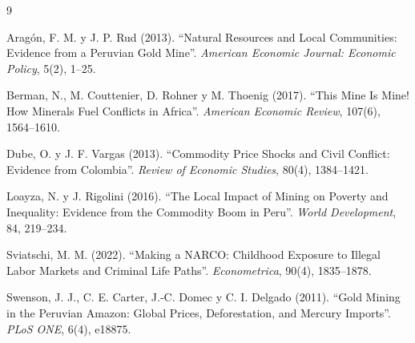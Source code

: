 \documentclass[11pt,a4paper]{article}
\begin{document}
\begin{thebibliography}{9}
\small

Aragón, F. M. y J. P. Rud (2013). ``Natural Resources and Local Communities: Evidence from a Peruvian Gold Mine''. \emph{American Economic Journal: Economic Policy}, 5(2), 1--25.

Berman, N., M. Couttenier, D. Rohner y M. Thoenig (2017). ``This Mine Is Mine! How Minerals Fuel Conflicts in Africa''. \emph{American Economic Review}, 107(6), 1564--1610.

Dube, O. y J. F. Vargas (2013). ``Commodity Price Shocks and Civil Conflict: Evidence from Colombia''. \emph{Review of Economic Studies}, 80(4), 1384--1421.

Loayza, N. y J. Rigolini (2016). ``The Local Impact of Mining on Poverty and Inequality: Evidence from the Commodity Boom in Peru''. \emph{World Development}, 84, 219--234.

Sviatschi, M. M. (2022). ``Making a NARCO: Childhood Exposure to Illegal Labor Markets and Criminal Life Paths''. \emph{Econometrica}, 90(4), 1835--1878.

Swenson, J. J., C. E. Carter, J.-C. Domec y C. I. Delgado (2011). ``Gold Mining in the Peruvian Amazon: Global Prices, Deforestation, and Mercury Imports''. \emph{PLoS ONE}, 6(4), e18875.

\end{thebibliography}
\end{document}

